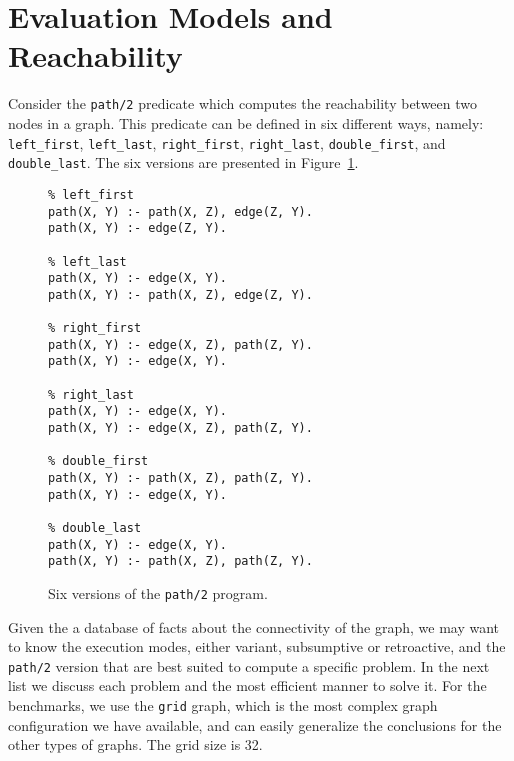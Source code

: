 \section{Evaluation Models and Reachability}

Consider the \texttt{path/2} predicate which computes the reachability between two nodes in a graph.
This predicate can be defined in six different ways, namely: \texttt{left\_first}, \texttt{left\_last},
\texttt{right\_first}, \texttt{right\_last}, \texttt{double\_first}, and \texttt{double\_last}.
The six versions are presented in Figure~\ref{fig:path_versions}.

\begin{figure}[ht]
\begin{Verbatim}
% left_first
path(X, Y) :- path(X, Z), edge(Z, Y).
path(X, Y) :- edge(Z, Y).

% left_last
path(X, Y) :- edge(X, Y).
path(X, Y) :- path(X, Z), edge(Z, Y).

% right_first
path(X, Y) :- edge(X, Z), path(Z, Y).
path(X, Y) :- edge(X, Y).

% right_last
path(X, Y) :- edge(X, Y).
path(X, Y) :- edge(X, Z), path(Z, Y).

% double_first
path(X, Y) :- path(X, Z), path(Z, Y).
path(X, Y) :- edge(X, Y).

% double_last
path(X, Y) :- edge(X, Y).
path(X, Y) :- path(X, Z), path(Z, Y).
\end{Verbatim}
\caption{Six versions of the \texttt{path/2} program.}
\label{fig:path_versions}
\end{figure}

Given the a database of facts about the connectivity of the graph, we may want to know the
execution modes, either variant, subsumptive or retroactive, and the \texttt{path/2} version
that are best suited to compute a specific problem. In the next list we discuss each problem
and the most efficient manner to solve it. For the benchmarks, we use the \texttt{grid} graph,
which is the most complex graph configuration we have available, and can easily generalize
the conclusions for the other types of graphs. The grid size is 32.

